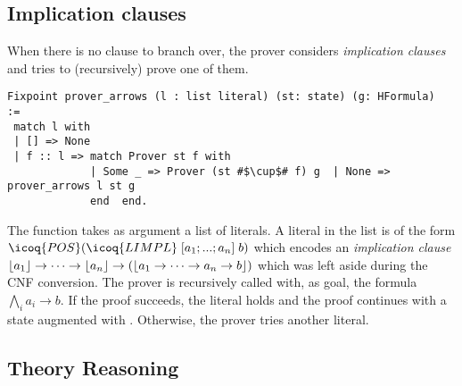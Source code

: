 \documentclass[utf8,a4paper,UKenglish,cleveref, autoref, thm-restate]{lipics-v2021}
\begin{document}
\subsection{Implication clauses}
When there is no clause to branch over, the prover considers 
\emph{implication clauses} and tries to (recursively) prove one of
them.
\begin{verbatim}
Fixpoint prover_arrows (l : list literal) (st: state) (g: HFormula)  :=
 match l with
 | [] => None
 | f :: l => match Prover st f with
             | Some _ => Prover (st #$\cup$# f) g  | None => prover_arrows l st g
             end  end.
\end{verbatim}
The function  takes as argument a list  of
literals.  A literal  in the list is of the form
$\icoq{POS} (\icoq{LIMPL}\; [a_1;...;a_n]\; b)$ which encodes an \emph{implication clause}
$\lfloor a_1 \rfloor \to \dots \to \lfloor a_n \rfloor \to (\lfloor a_1 \to \dots \to a_n \to b \rfloor)$ which was left 
aside during the  CNF conversion. %
%
The prover is recursively called with, as goal,
the formula $\bigwedge_i a_i \to b$. If the proof succeeds, the literal  holds
and the proof continues with a state augmented with .
Otherwise, the prover tries another literal.
%

\subsection{Theory Reasoning}
\label{sec:thy-reasoning}
\end{document}
